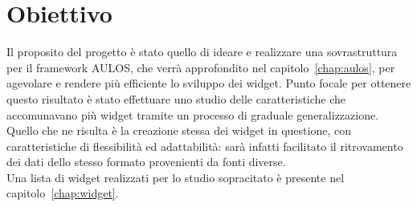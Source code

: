 \section{Obiettivo}
Il proposito del progetto è stato quello di ideare e realizzare una sovrastruttura per il framework AULOS, che verrà approfondito nel capitolo~\ref{chap:aulos}, per agevolare e rendere più efficiente lo sviluppo dei widget. Punto focale per ottenere questo risultato è stato effettuare uno studio delle caratteristiche che accomunavano più widget tramite un processo di graduale generalizzazione.
Quello che ne risulta è la creazione stessa dei widget in questione, con caratteristiche di flessibilità ed adattabilità: sarà infatti facilitato il ritrovamento dei dati dello stesso formato provenienti da fonti diverse. \\
Una lista di widget realizzati per lo studio sopracitato è presente nel capitolo~\ref{chap:widget}. 